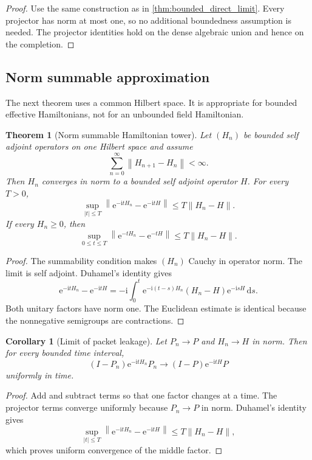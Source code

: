 \documentclass{aomart}
\newtheorem{theorem}{Theorem}[section]
\newtheorem{corollary}[corollary]{Corollary}
\theoremstyle{definition}
\theoremstyle{remark}
\newcommand{\e}{\mathrm e}
\newcommand{\ii}{\mathrm i}
\newcommand{\dd}{\,\mathrm d}
\newcommand{\norm}[1]{\left\lVert#1\right\rVert}
\newcommand{\abs}[1]{\left\lvert#1\right\rvert}
\begin{document}
\begin{proof}
Use the same construction as in \cref{thm:bounded_direct_limit}. Every projector has norm at most one, so no additional boundedness assumption is needed. The projector identities hold on the dense algebraic union and hence on the completion.
\end{proof}

\subsection{Norm summable approximation}\label{subsec:norm_summable}

The next theorem uses a common Hilbert space. It is appropriate for bounded effective Hamiltonians, not for an unbounded field Hamiltonian.

\begin{theorem}[Norm summable Hamiltonian tower]\label{thm:norm_summable_tower}
Let \((H_n)\) be bounded self adjoint operators on one Hilbert space and assume
\[
\sum_{n=0}^{\infty}\norm{H_{n+1}-H_n}<\infty.
\]
Then \(H_n\) converges in norm to a bounded self adjoint operator \(H\). For every \(T>0\),
\[
\sup_{\abs t\leq T}
\norm{\e^{-\ii tH_n}-\e^{-\ii tH}}
\leq
T\norm{H_n-H}.
\]
If every \(H_n\geq0\), then
\[
\sup_{0\leq t\leq T}
\norm{\e^{-tH_n}-\e^{-tH}}
\leq
T\norm{H_n-H}.
\]
\end{theorem}

\begin{proof}
The summability condition makes \((H_n)\) Cauchy in operator norm. The limit is self adjoint. Duhamel's identity gives
\[
\e^{-\ii tH_n}-\e^{-\ii tH}
=-\ii\int_0^t
\e^{-\ii(t-s)H_n}(H_n-H)\e^{-\ii sH}\dd s.
\]
Both unitary factors have norm one. The Euclidean estimate is identical because the nonnegative semigroups are contractions.
\end{proof}

\begin{corollary}[Limit of packet leakage]\label{cor:limit_leakage}
Let \(P_n\to P\) and \(H_n\to H\) in norm. Then for every bounded time interval,
\[
(I-P_n)\e^{-\ii tH_n}P_n
\longrightarrow
(I-P)\e^{-\ii tH}P
\]
uniformly in time.
\end{corollary}

\begin{proof}
Add and subtract terms so that one factor changes at a time. The projector terms converge uniformly because \(P_n\to P\) in norm. Duhamel's identity gives
\[
\sup_{\abs t\leq T}
\norm{\e^{-\ii tH_n}-\e^{-\ii tH}}
\leq
T\norm{H_n-H},
\]
which proves uniform convergence of the middle factor.
\end{proof}
\end{document}
